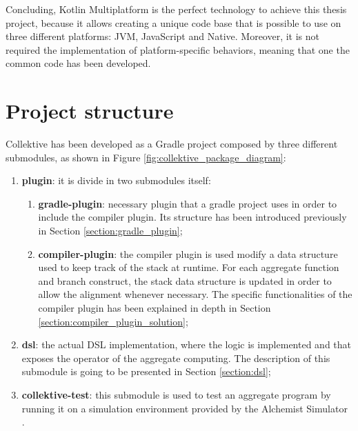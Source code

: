 Concluding, Kotlin Multiplatform is the perfect technology to achieve this thesis project, because it allows creating a unique code base that is possible to use on three different platforms: JVM, JavaScript and Native. Moreover, it is not required the implementation of platform-specific behaviors, meaning that one the common code has been developed.

\section{Project structure}\label{section:project_structure}
Collektive has been developed as a Gradle project composed by three different submodules, as shown in Figure \ref{fig:collektive_package_diagram}:
\begin{enumerate}
    \item \textbf{plugin}: it is divide in two submodules itself: 
    \begin{enumerate}
        \item \textbf{gradle-plugin}: necessary plugin that a gradle project uses in order to include the compiler plugin. Its structure has been introduced previously in Section \ref{section:gradle_plugin};
        \item \textbf{compiler-plugin}: the compiler plugin is used modify a data structure used to keep track of the stack at runtime. For each aggregate function and branch construct, the stack data structure is updated in order to allow the alignment whenever necessary. The specific functionalities of the compiler plugin has been explained in depth in Section \ref{section:compiler_plugin_solution}; 
    \end{enumerate}
    \item \textbf{dsl}: the actual DSL implementation, where the logic is implemented and that exposes the operator of the aggregate computing. The description of this submodule is going to be presented in Section \ref{section:dsl};
    \item \textbf{collektive-test}: this submodule is used to test an aggregate program by running it on a simulation environment provided by the Alchemist Simulator \cite{alchemist}.
\end{enumerate}
